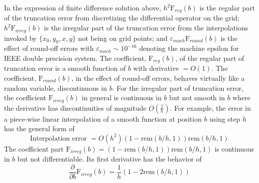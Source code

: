 \documentclass[10pt]{article}
\begin{document}
In the expression of finite difference solution above, 
$h^2 \mbox{F}_{reg}(b) $ is the regular part of 
the truncation error from discretizing the differential operator on the grid; 
$h^2 \mbox{F}_{irreg}(b) $ is the irregular part of the truncation error 
from the interpolations invoked by $\{x_0, y_0, x, y \}$ not being on grid points; 
and $\varepsilon_{mach} \mbox{F}_{round}(b) $ is the effect of round-off errors
with $\varepsilon_{mach} \sim 10^{-16}$ denoting the machine epsilon for 
IEEE double precision system. 
The coefficient, $\mbox{F}_{reg}(b) $, of the regular part of truncation error 
is a smooth function of $b$ with derivative $= O(1)$. 
The coefficient, $\mbox{F}_{round}(b) $, in the effect of round-off errors, 
behaves virtually like a random variable, discontinuous in $b$. 
For the irregular part of truncation error, the coefficient $\mbox{F}_{irreg}(b) $ 
in general is continuous in $b$ but not smooth in $b$ where the derivative has 
discontinuities of magnitude $O\left( \frac{1}{h} \right)$. 
For example, the error in 
a piece-wise linear interpolation of a smooth function at position $b$ using step $h$ 
has the general form of 
$$\mbox{Interpolation error } = O(h^2) (1-\mbox{rem}(b/h,1)) \mbox{rem}(b/h,1)$$ 
The coefficient part $\mbox{F}_{irreg}(b) = (1-\mbox{rem}(b/h,1)) \mbox{rem}(b/h,1) $ 
is continuous in $b$ but not differentiable. Its first derivative 
has the behavior of 
$$ \frac{\partial }{\partial b} \mbox{F}_{irreg}(b) =  \frac{1}{h} \left(1-2\mbox{rem}(b/h,1) \right)$$
\end{document}

